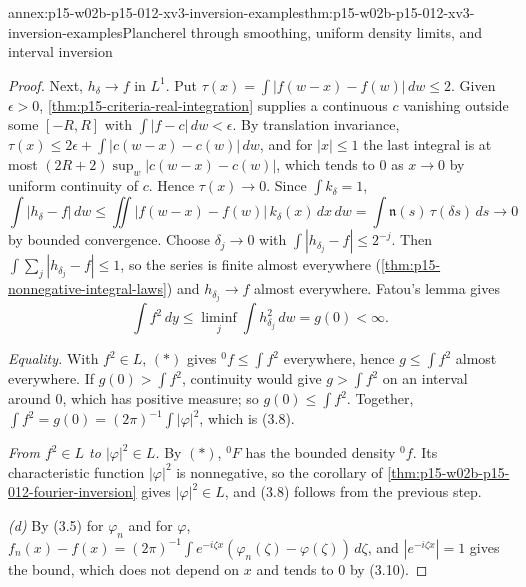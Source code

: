 \begin{annexitem}{annex:p15-w02b-p15-012-xv3-inversion-examples}{thm:p15-w02b-p15-012-xv3-inversion-examples}{Plancherel through smoothing, uniform density limits, and interval inversion}
\begin{proof}
Next, \(h_\delta\to f\) in \(L^1\). Put \(\tau(x)=\int|f(w-x)-f(w)|\,dw\leq2\).
Given \(\epsilon>0\), \cref{thm:p15-criteria-real-integration} supplies a
continuous \(c\) vanishing outside some \([-R,R]\) with
\(\int|f-c|\,dw<\epsilon\). By translation invariance,
\(\tau(x)\leq2\epsilon+\int|c(w-x)-c(w)|\,dw\), and for \(|x|\leq1\) the last
integral is at most \((2R+2)\sup_w|c(w-x)-c(w)|\), which tends to \(0\) as
\(x\to0\) by uniform continuity of \(c\). Hence \(\tau(x)\to0\). Since
\(\int k_\delta=1\),
\[
 \int|h_\delta-f|\,dw\leq\iint|f(w-x)-f(w)|\,k_\delta(x)\,dx\,dw
   =\int\mathfrak n(s)\,\tau(\delta s)\,ds\longrightarrow0
\]
by bounded convergence. Choose \(\delta_j\to0\) with
\(\int|h_{\delta_j}-f|\leq2^{-j}\). Then
\(\int\sum_j|h_{\delta_j}-f|\leq1\), so the series is finite almost
everywhere (\cref{thm:p15-nonnegative-integral-laws}) and
\(h_{\delta_j}\to f\) almost everywhere. Fatou's lemma gives
\[
 \int f^2\,dy\leq\liminf_j\int h_{\delta_j}^2\,dw=g(0)<\infty .
\]

\emph{Equality.} With \(f^2\in L\), \((\ast)\) gives
\({}^0f\leq\int f^2\) everywhere, hence \(g\leq\int f^2\) almost everywhere.
If \(g(0)>\int f^2\), continuity would give \(g>\int f^2\) on an interval
around \(0\), which has positive measure; so \(g(0)\leq\int f^2\). Together,
\(\int f^2=g(0)=(2\pi)^{-1}\int|\varphi|^2\), which is (3.8).

\emph{From \(f^2\in L\) to \(|\varphi|^2\in L\).} By \((\ast)\), \({}^0F\) has
the bounded density \({}^0f\). Its characteristic function \(|\varphi|^2\) is
nonnegative, so the corollary of
\cref{thm:p15-w02b-p15-012-fourier-inversion} gives \(|\varphi|^2\in L\), and
(3.8) follows from the previous step.

\emph{(d)} By (3.5) for \(\varphi_n\) and for \(\varphi\),
\(f_n(x)-f(x)=(2\pi)^{-1}\int e^{-i\zeta x}(\varphi_n(\zeta)-\varphi(\zeta))\,d\zeta\),
and \(|e^{-i\zeta x}|=1\) gives the bound, which does not depend on \(x\) and
tends to \(0\) by (3.10).


\end{proof}
\end{annexitem}
